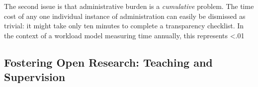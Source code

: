 \documentclass[meta, authordate]{jote-new-article}
\begin{document}
The second issue is that administrative burden is a \emph{cumulative} problem. The time cost of any one individual instance of administration can easily be dismissed as trivial: it might take only ten minutes to complete a transparency checklist. In the context of a workload model measuring time annually, this represents <.01%







\subsection{Fostering Open Research: Teaching and Supervision}
\end{document}
